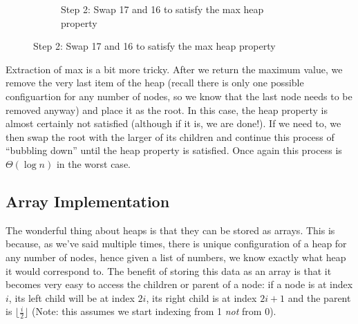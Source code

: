 \begin{figure}[h]
\begin{subfigure}[b]{0.3\textwidth}
        \caption{Step 2: Swap 17 and 16 to satisfy the max heap property}
        \label{fig:insert_step2}
    \end{subfigure}
\end{figure}

Extraction of max is a bit more tricky. After we return the maximum value, we remove the very last item of the heap (recall there is only one possible configuartion for any number of nodes, so we know that the last node needs to be removed anyway) and place it as the root. In this case, the heap property is almost certainly not satisfied (although if it is, we are done!). If we need to, we then swap the root with the larger of its children and continue this process of ``bubbling down'' until the heap property is satisfied. Once again this process is $\Theta(\log n)$ in the worst case.


\subsection{Array Implementation}
The wonderful thing about heaps is that they can be stored as arrays. This is because, as we've said multiple times, there is unique configuration of a heap for any number of nodes, hence given a list of numbers, we know exactly what heap it would correspond to. The benefit of storing this data as an array is that it becomes very easy to access the children or parent of a node: if a node is at index $i$, its left child will be at index $2i$, its right child is at index $2i + 1$ and the parent is $\lfloor \frac{i}{2} \rfloor$ (Note: this assumes we start indexing from 1 \textit{not} from 0).

